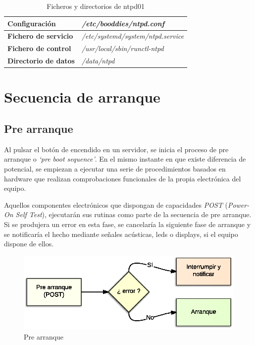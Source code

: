 \documentclass[a4paper,12pt,spanish,final]{epsc_tfc_pfc}
\begin{document}
\begin{table}[h]

  \centering

  \begin{tabular}{ll}
    \toprule
    \textbf{Configuración}        & \textit{/etc/booddies/ntpd.conf}          \\
    \midrule
    \rowcolor[HTML]{EFEFEF}
    \textbf{Fichero de servicio}  & \textit{/etc/systemd/system/ntpd.service} \\
    \midrule
    \textbf{Fichero de control}   & \textit{/usr/local/sbin/runctl-ntpd}      \\
    \midrule
    \rowcolor[HTML]{EFEFEF}
    \textbf{Directorio de datos}  & \textit{/data/ntpd}                       \\
    \bottomrule
  \end{tabular}

  \caption{Ficheros y directorios de ntpd01}

\end{table}


\chapter{Secuencia de arranque}

\section{Pre arranque}
Al pulsar el botón de encendido en un servidor, se inicia el proceso de pre arranque o \emph{`pre boot sequence'}. En el mismo instante en que existe diferencia de potencial, se empiezan a ejecutar una serie de procedimientos basados en hardware que realizan comprobaciones funcionales de la propia electrónica del equipo.

Aquellos componentes electrónicos que dispongan de capacidades \emph{POST} (\emph{Power-On Self Test}), ejecutarán sus rutinas como parte de la secuencia de pre arranque. Si se produjera un error en esta fase, se cancelaría la siguiente fase de arranque y se notificaría el hecho mediante señales acústicas, leds o displays, si el equipo dispone de ellos.

\begin{figure}[h]
  \centering
    \includegraphics[scale=1]{pre_arranque}
      \caption{Pre arranque}
\end{figure}
\end{document}
